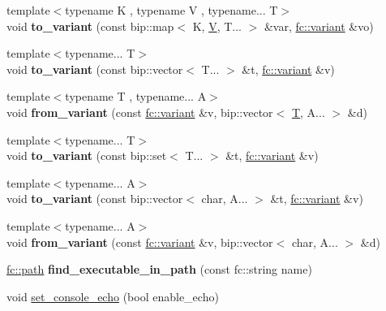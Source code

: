 \begin{DoxyCompactItemize}
{\footnotesize template$<$typename K , typename V , typename... T$>$ }\\void {\bfseries to\+\_\+variant} (const bip\+::map$<$ K, \mbox{\hyperlink{struct_v}{V}}, T... $>$ \&var, \mbox{\hyperlink{classfc_1_1variant}{fc\+::variant}} \&vo)
\item 
\mbox{\label{namespacefc_a25f8d64421961b952ac4831ce3ccd2b7}} 
{\footnotesize template$<$typename... T$>$ }\\void {\bfseries to\+\_\+variant} (const bip\+::vector$<$ T... $>$ \&t, \mbox{\hyperlink{classfc_1_1variant}{fc\+::variant}} \&v)
\item 
\mbox{\label{namespacefc_ab1506b1f7b526b0e7d5498e1ec9f97c6}} 
{\footnotesize template$<$typename T , typename... A$>$ }\\void {\bfseries from\+\_\+variant} (const \mbox{\hyperlink{classfc_1_1variant}{fc\+::variant}} \&v, bip\+::vector$<$ \mbox{\hyperlink{struct_t}{T}}, A... $>$ \&d)
\item 
\mbox{\label{namespacefc_ac3717dabdce46f0e90995f3c0715169b}} 
{\footnotesize template$<$typename... T$>$ }\\void {\bfseries to\+\_\+variant} (const bip\+::set$<$ T... $>$ \&t, \mbox{\hyperlink{classfc_1_1variant}{fc\+::variant}} \&v)
\item 
\mbox{\label{namespacefc_af66629506a44bc7be83e5693420169f4}} 
{\footnotesize template$<$typename... A$>$ }\\void {\bfseries to\+\_\+variant} (const bip\+::vector$<$ char, A... $>$ \&t, \mbox{\hyperlink{classfc_1_1variant}{fc\+::variant}} \&v)
\item 
\mbox{\label{namespacefc_a50a302798e744ae0ed7e25bcf61b838c}} 
{\footnotesize template$<$typename... A$>$ }\\void {\bfseries from\+\_\+variant} (const \mbox{\hyperlink{classfc_1_1variant}{fc\+::variant}} \&v, bip\+::vector$<$ char, A... $>$ \&d)
\item 
\mbox{\label{namespacefc_ad3297da9a0f1353ee019005de958dc0b}} 
\mbox{\hyperlink{classfc_1_1path}{fc\+::path}} {\bfseries find\+\_\+executable\+\_\+in\+\_\+path} (const fc\+::string name)
\item 
void \mbox{\hyperlink{namespacefc_a3c65c900ae821804d7aab337ad41eac6}{set\+\_\+console\+\_\+echo}} (bool enable\+\_\+echo)

\end{DoxyCompactItemize}
